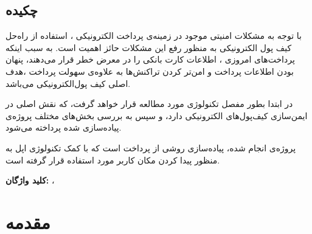 \documentclass{book}
\begin{document}
 
 \section*{چکیده}
\Large \noindent
با توجه به مشکلات امنیتی موجود در زمینه‌ی پرداخت الکترونیکی ، استفاده از راه‌حل‌ کیف پول الکترونیکی به منظور رفع این مشکلات حائز اهمیت است. به سبب اینکه پرداخت‌های امروزی ، اطلاعات کارت بانکی را در معرض خطر قرار می‌دهند، پنهان بودن اطلاعات پرداخت و امن‌تر کردن تراکنش‌ها به علاوه‌ی سهولت پرداخت ،هدف اصلی کیف پول‌الکترونیکی می‌باشد.

\noindent
در ابتدا بطور مفصل تکنولوژی‌
	{\large {}}
مورد مطالعه قرار خواهد گرفت، که نقش اصلی در ایمن‌سازی کیف‌پول‌های الکترونیکی دارد، و سپس به بررسی بخش‌های مختلف پروژه‌ی پیاده‌سازی شده پرداخته می‌شود.

\noindent
پروژه‌ی انجام شده، پیاده‌سازی روشی از پرداخت است که با کمک تکنولوژی
{\large {}}
اپل به منظور پیدا کردن مکان کاربر مورد استفاده قرار گرفته است.


\vspace*{1cm}
\noindent
\textbf{کلید واژگان: } 
{\large {}} ، {\large {}} 

{\let\cleardoublepage\clearpage 
	\tableofcontents
}
	

	
	\chapter{مقدمه}\label{chap1}
	
\end{document}
